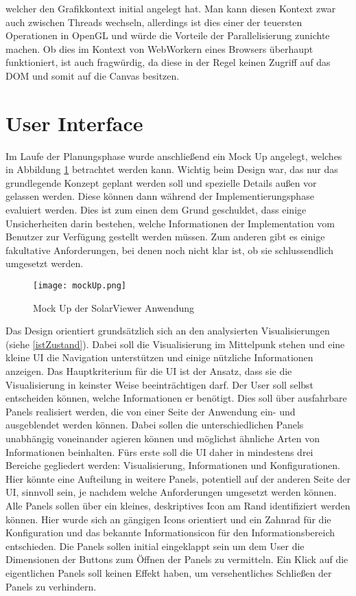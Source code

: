 welcher den Grafikkontext initial angelegt hat. Man kann diesen Kontext zwar auch zwischen Threads wechseln, allerdings ist dies einer der teuersten Operationen in OpenGL und würde die Vorteile der Parallelisierung zunichte machen. Ob dies im Kontext von WebWorkern eines Browsers überhaupt funktioniert, ist auch fragwürdig, da diese in der Regel keinen Zugriff auf das DOM und somit auf die Canvas besitzen.

\section{User Interface}
Im Laufe der Planungsphase wurde anschließend ein Mock Up angelegt, welches in Abbildung \ref{mockUp} betrachtet werden kann. Wichtig beim Design war, das nur das grundlegende Konzept geplant werden soll und spezielle Details außen vor gelassen werden. Diese können dann während der Implementierungsphase evaluiert werden. Dies ist zum einen dem Grund geschuldet, dass einige Unsicherheiten darin bestehen, welche Informationen der Implementation vom Benutzer zur Verfügung gestellt werden müssen. Zum anderen gibt es einige fakultative Anforderungen, bei denen noch nicht klar ist, ob sie schlussendlich umgesetzt werden.

\begin{figure}[H]
  \texttt{[image: mockUp.png]}
  \caption{Mock Up der SolarViewer Anwendung}
  \label{mockUp}
\end{figure}

Das Design orientiert grundsätzlich sich an den analysierten Visualisierungen (siehe \ref{istZustand}). Dabei soll die Visualisierung im Mittelpunk stehen und eine kleine UI die Navigation unterstützen und einige nützliche Informationen anzeigen. Das Hauptkriterium für die UI ist der Ansatz, dass sie die Visualisierung in keinster Weise beeinträchtigen darf. Der User soll selbst entscheiden können, welche Informationen er benötigt. Dies soll über ausfahrbare Panels realisiert werden, die von einer Seite der Anwendung ein- und ausgeblendet werden können. Dabei sollen die unterschiedlichen Panels unabhängig voneinander agieren können und möglichst ähnliche Arten von Informationen beinhalten. Fürs erste soll die UI daher in mindestens drei Bereiche gegliedert werden: Visualisierung, Informationen und Konfigurationen. Hier könnte eine Aufteilung in weitere Panels, potentiell auf der anderen Seite der UI, sinnvoll sein, je nachdem welche Anforderungen umgesetzt werden können. Alle Panels sollen über ein kleines, deskriptives Icon am Rand identifiziert werden können. Hier wurde sich an gängigen Icons orientiert und ein Zahnrad für die Konfiguration und das bekannte Informationsicon für den Informationsbereich entschieden. Die Panels sollen initial eingeklappt sein um dem User die Dimensionen der Buttons zum Öffnen der Panels zu vermitteln. Ein Klick auf die eigentlichen Panels soll keinen Effekt haben, um versehentliches Schließen der Panels zu verhindern.

